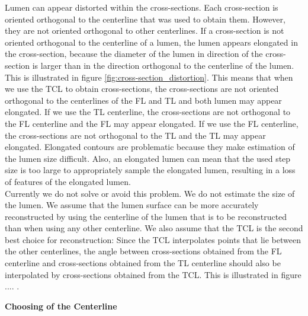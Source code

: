 \documentclass[thesis.tex]{subfiles}
\begin{document}
Lumen can appear distorted within the cross-sections. Each cross-section is oriented orthogonal to the centerline that was used to obtain them. However, they are not oriented orthogonal to other centerlines. If a cross-section is not oriented orthogonal to the centerline of a lumen, the lumen appears elongated in the cross-section, because the diameter of the lumen in direction of the cross-section is larger than in the direction orthogonal to the centerline of the lumen. This is illustrated in figure \ref{fig:cross-section_distortion}. This means that when we use the TCL to obtain cross-sections, the cross-sections are not oriented orthogonal to the centerlines of the FL and TL and both lumen may appear elongated. If we use the TL centerline, the cross-sections are not orthogonal to the FL centerline and the FL may appear elongated. If we use the FL centerline, the cross-sections are not orthogonal to the TL and the TL may appear elongated. Elongated contours are problematic because they make estimation of the lumen size difficult. Also, an elongated lumen can mean that the used step size is too large to appropriately sample the elongated lumen, resulting in a loss of features of the elongated lumen. \\ Currently we do not solve or avoid this problem. We do not estimate the size of the lumen. We assume that the lumen surface can be more accurately reconstructed by using the centerline of the lumen that is to be reconstructed than when using any other centerline. We also assume that the TCL is the second best choice for reconstruction: Since the TCL interpolates points that lie between the other centerlines, the angle between cross-sections obtained from the FL centerline and cross-sections obtained from the TL centerline should also be interpolated by cross-sections obtained from the TCL. This is illustrated in figure .... .

\textbf{Choosing of the Centerline}
\end{document}

